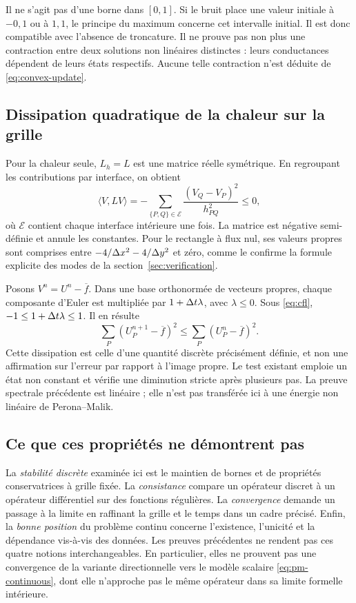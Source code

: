 Il ne s'agit pas d'une borne dans $[0,1]$. Si le bruit place une valeur
initiale à $-0{,}1$ ou à $1{,}1$, le principe du maximum concerne cet
intervalle initial. Il est donc compatible avec l'absence de troncature.
Il ne prouve pas non plus une contraction entre deux solutions non
linéaires distinctes : leurs conductances dépendent de leurs états
respectifs. Aucune telle contraction n'est déduite de
\eqref{eq:convex-update}.

\subsection{Dissipation quadratique de la chaleur sur la grille}

Pour la chaleur seule, $L_h=L$ est une matrice réelle symétrique.
En regroupant les contributions par interface, on obtient
\begin{equation}
 \langle V,LV\rangle
 =-\sum_{\{P,Q\}\in\mathcal E}
    \frac{(V_Q-V_P)^2}{h_{PQ}^2}\leq0,
 \label{eq:linear-discrete-form}
\end{equation}
où $\mathcal E$ contient chaque interface intérieure une fois.
La matrice est négative semi-définie et annule les constantes.
Pour le rectangle à flux nul, ses valeurs propres sont comprises
entre $-4/\Delta x^2-4/\Delta y^2$ et zéro, comme le confirme la formule
explicite des modes de la section~\ref{sec:verification}.

Posons $V^n=U^n-\overline f$. Dans une base orthonormée de vecteurs
propres, chaque composante d'Euler est multipliée par
$1+\Delta t\lambda$, avec $\lambda\leq0$. Sous \eqref{eq:cfl},
$-1\leq1+\Delta t\lambda\leq1$. Il en résulte
\begin{equation}
 \sum_P (U^{n+1}_P-\overline f)^2
 \leq\sum_P (U^n_P-\overline f)^2.
 \label{eq:linear-discrete-l2}
\end{equation}
Cette dissipation est celle d'une quantité discrète précisément
définie, et non une affirmation sur l'erreur par rapport à l'image
propre. Le test existant emploie un état non constant et vérifie une
diminution stricte après plusieurs pas. La preuve spectrale précédente
est linéaire ; elle n'est pas transférée ici à une énergie non linéaire
de Perona--Malik.

\subsection{Ce que ces propriétés ne démontrent pas}

La \emph{stabilité discrète} examinée ici est le maintien de bornes
et de propriétés conservatrices à grille fixée. La \emph{consistance}
compare un opérateur discret à un opérateur différentiel sur des
fonctions régulières. La \emph{convergence} demande un passage à la
limite en raffinant la grille et le temps dans un cadre précisé.
Enfin, la \emph{bonne position} du problème continu concerne
l'existence, l'unicité et la dépendance vis-à-vis des données.
Les preuves précédentes ne rendent pas ces quatre notions
interchangeables. En particulier, elles ne prouvent pas une convergence
de la variante directionnelle vers le modèle scalaire
\eqref{eq:pm-continuous}, dont elle n'approche pas le même opérateur
dans sa limite formelle intérieure.
